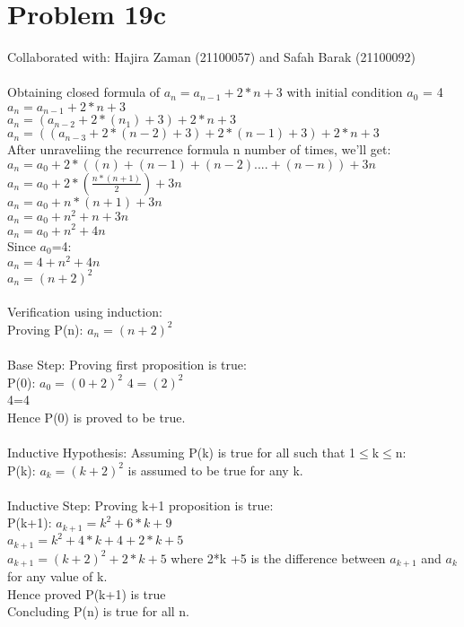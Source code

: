 \documentclass{article}
\begin{document}
\section{Problem 19c}
Collaborated with:  Hajira Zaman (21100057) and Safah Barak (21100092)\\\\
Obtaining closed formula of $a_{n} = a_{n-1} + 2*n + 3$ with initial condition $a_{0}$ = 4 \\
$a_{n} = a_{n-1} + 2*n + 3$ \\
$a_{n} = (a_{n-2} +2*(n_1) +3) + 2*n + 3$\\
$a_{n} = ((a_{n-3} + 2*(n-2) +3) +2*(n-1) +3) + 2*n + 3$\\
After unraveliing the recurrence formula n number of times, we'll get: \\
$a_{n} =a_{0} + 2*((n)+(n-1)+(n-2)....+(n-n)) +3n$\\
$a_{n} =a_{0} + 2*(\frac{n*(n+1)}{2}) +3n$\\
$a_{n} =a_{0} + n*(n+1) +3n$\\
$a_{n} =a_{0} + n^{2} + n +3n$\\
$a_{n} =a_{0} + n^{2} + 4n$\\
Since $a_{0}$=4: \\
$a_{n} =4 + n^{2} + 4n$\\
$a_{n} =(n+2)^{2}$\\\\
Verification using induction:\\
Proving P(n): $a_{n} =(n+2)^{2}$\\\\
Base Step: Proving first proposition is true:\\
P(0): $a_{0} =(0+2)^{2}$
$4 =(2)^{2}$ \\
4=4\\
Hence P(0) is proved to be true. \\\\
Inductive Hypothesis: Assuming P(k) is true for all  such that  1$\leq$k$\leq$n:\\
P(k): $a_{k} =(k+2)^{2}$ is assumed to be true for any k. \\\\
Inductive Step: Proving  k+1 proposition is true:\\
P(k+1): $a_{k+1} =k^{2} + 6*k +9$ \\
$a_{k+1} = k^{2} + 4*k + 4 + 2*k +5 $\\
$a_{k+1} = (k+2)^{2} + 2*k + 5$ where 2*k +5 is the difference between $a_{k+1}$ and $a_{k}$ for any value of k. \\
Hence proved P(k+1) is true \\
Concluding P(n) is true for all n.\\
\end{document}

